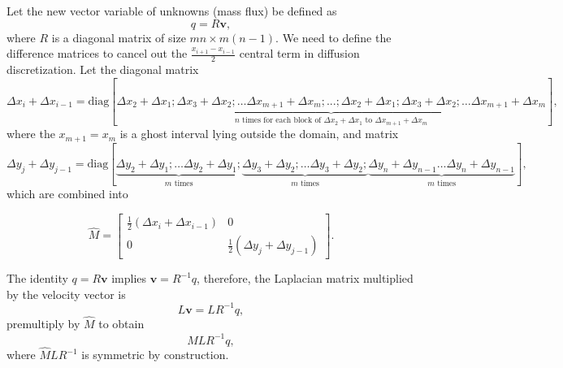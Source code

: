 \documentclass{article}
\begin{document}
Let the new vector variable of unknowns (mass flux) be defined as
$${q} = R\boldsymbol{v},$$ 
where $R$ is a diagonal matrix of size $mn\times m(n-1)$. We need to define the difference matrices to cancel out the $\frac{x_{i+1}−x_{i-1}}{2}$ central term in diffusion discretization. Let the diagonal matrix
\begin{equation*}
{\Delta x_i+\Delta x_{i-1}} = \text{diag}[\underbrace{\Delta x_2+\Delta x_1; \Delta x_3+\Delta x_2; \dotsc \Delta x_{m+1}+\Delta x_{m}; ...;\Delta x_2+\Delta x_1; \Delta x_3+\Delta x_2; \dotsc \Delta x_{m+1}+\Delta x_{m}}_{n\text{ times for each block of } \Delta x_2+\Delta x_1\text{ to }\Delta x_{m+1}+\Delta x_{m}}],
\end{equation*}
where the $x_{m+1}=x_m$ is a ghost interval lying outside the domain, and matrix
\begin{equation*}
{\Delta y_j+\Delta y_{j-1}} = \text{diag}[\underbrace{\Delta y_2+\Delta y_1;  \dotsc \Delta y_2+\Delta y_1;}_{m\text{ times}} \underbrace{\Delta y_3+\Delta y_2; \dotsc \Delta y_3+\Delta y_2;}_{m\text{ times}} \underbrace{\Delta y_n+\Delta y_{n-1}\dotsc \Delta y_n+\Delta y_{n-1}}_{m\text{ times}}],	
\end{equation*}
which are combined into

\begin{equation*}
\hat{M} =\left[\begin{array}{cc}
\frac{1}{2}\left(\Delta x_i+\Delta x_{i-1}\right) & 0 \\
0 & \frac{1}{2}\left(\Delta y_j+\Delta y_{j-1}\right)
\end{array}\right].
\end{equation*}

The identity ${q}=R\boldsymbol{v}$ implies $\boldsymbol{v}=R^{-1}{q}$, therefore, the Laplacian matrix multiplied by the velocity vector is
$$L\boldsymbol{v}= LR^{-1}{q},$$ 
premultiply by $\hat M$ to obtain 
$$\hat MLR^{-1}{q},$$ 
where $\hat M L R^{-1}$ is symmetric by construction.  
\end{document}
